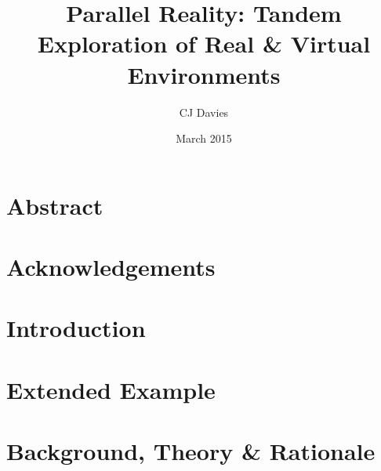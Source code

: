 \documentclass{report}
\begin{document}
\title{Parallel Reality: Tandem Exploration of Real \& Virtual Environments}
\date{March 2015}
\author{CJ Davies}
\maketitle





\chapter*{Abstract}



\chapter*{Acknowledgements}



\tableofcontents


\chapter{Introduction}



\chapter{Extended Example}



\chapter{Background, Theory \& Rationale}
%
\graphicspath{ {03_background/images/} }

\end{document}

